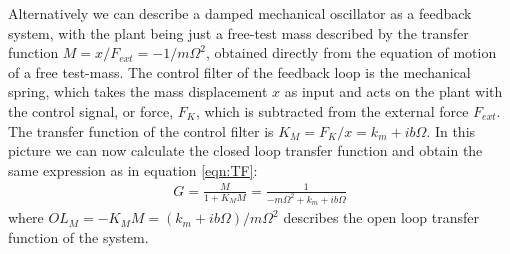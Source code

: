 \documentclass[%
 reprint,
 amsmath,amssymb,
 aps,
]{revtex4-1}
\begin{document}
Alternatively we can describe a damped mechanical oscillator as a feedback system,  with the plant being just a free-test mass described by the transfer function 
$M=x/F_{ext}=-1/m\Omega^2$,
obtained directly from the equation of motion of a free test-mass. 
The control filter of the feedback loop is the mechanical spring, which takes the mass displacement $x$ as input and acts on the plant with the control signal, or force, $F_K$, which is subtracted from the external force $F_{ext}$.
The transfer function of the control filter is $K_M=F_{K}/x=k_m+ib\Omega$. In this picture we can now calculate the closed loop transfer function and obtain the same expression as in equation \ref{eqn:TF}:
\begin{eqnarray}
\label{eqn:TF_fm}
G=\frac{M}{1+K_M M}=
\frac{1}{-m\Omega^2+k_m+ib\Omega}
\end{eqnarray}
where $OL_M=-K_M  M = (k_m+ib\Omega)/m\Omega^2$ describes the open loop transfer function of the system.

\end{document}
